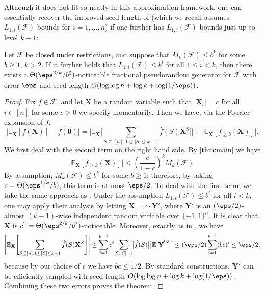 Although it does not fit so neatly in this approximation framework, one can essentially recover the improved seed length of \cite{CHHL} (which we recall assumes $L_{1,i}(\mathcal{F})$ bounds for $i=1,\ldots, n$) if one further has $L_{1,i}(\mathcal{F})$ bounds just up to level $k-1$:
\begin{THM}
\label{thm:l1bounds}
        Let $\mathcal{F}$ be closed under restrictions, and suppose that $M_k(\mathcal{F})\leq b^k$ for some $b\geq 1$, $k>2$. If it further holds that $L_{1,i}(\mathcal{F})\leq b^{i}$ for all $1\leq i<k$, then there exists a $\Theta(\eps^{2/k}/b^2)$-noticeable fractional pseudorandom generator for $\mathcal{F}$ with error $\eps$ and seed length $O(\log\log n +\log k+\log(1/\eps))$.
    \end{THM}
    \begin{proof}
    Fix $f\in \mathcal{F}$, and let $\mathbf{X}$ be a random variable such that $\vert \mathbf{X}_i\vert=c$ for all $i \in [n]$ for some $c>0$ we specify momentarily. Then we have, via the Fourier expansion of $f$,
\begin{equation*}
    \bigl| \mathbb{E}_{\mathbf{X}}[f(\mathbf{X})]-f(\mathbf{0}) \bigr|
    = \Biggl| \mathbb{E}_{\mathbf{X}} \Biggl[ \sum_{S\subseteq [n]:1\leq \vert S\vert\leq k-1}\hat{f}(S)\mathbf{X}^S \Biggr] \Biggr|
    + \bigl| \mathbb{E}_{\mathbf{X}}[f_{\geq k}(\mathbf{X})] \bigr| .
\end{equation*}
We first deal with the second term on the right hand side.  By \cref{thm:main} we have
\begin{equation*}
    \bigl| \mathbb{E}_{\mathbf{X}}[f_{\geq k}(\mathbf{X})] \bigr|
    \leq \left(\frac{c}{1-c}\right)^k M_k(\mathcal{F}).
\end{equation*}
By assumption, $M_k(\mathcal{F})\leq b^k$ for some $b\geq 1$; therefore, by taking $c=\Theta(\eps^{1/k}/b)$, this term is at most $\eps/2$. To deal with the first term, we take the same approach as \cite{CHHL}. Under the assumption $L_{1,i}(\mathcal{F})\leq b^i$ for all $i<k$, one may apply their analysis by letting $\mathbf{X}=c\cdot \mathbf{Y}'$, where $\mathbf{Y}'$ is an $(\eps/2)$-almost $(k-1)$-wise independent random variable over $\{-1,1\}^n$.  It is clear that $\mathbf{X}$ is $c^2 = \Theta(\eps^{2/k}/b^2)$-noticeable.  Moreover, exactly as in \cite{CHHL}, we have
\begin{equation*}
    \Biggl| \mathbb{E}_{\mathbf{X}}\Biggl[\sum_{S\subseteq [n]:1\leq \vert S\vert\leq k-1}\hat{f}(S)\mathbf{X}^S\Biggr] \Biggr|
    \leq \sum_{i=1}^{k-1} c^i\sum_{S:\vert S\vert=i} \bigl| \hat{f}(S) \bigr| \bigl| \mathbb{E}[\mathbf{Y}^{'S}] \bigr| 
    \leq (\eps/2) \sum_{i=1}^{k-1} (bc)^i\leq \eps/2,
\end{equation*}
because by our choice of $c$ we have $bc \leq 1/2$. By standard constructions, $\mathbf{Y}'$ can be efficiently sampled with seed length $O(\log\log n +\log k+\log(1/\eps))$ \cite{naor1993small}.  Combining these two errors proves the theorem.
\end{proof}


